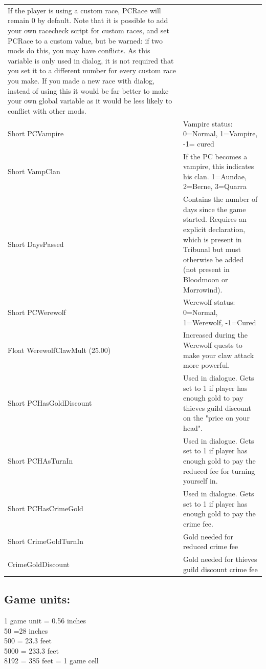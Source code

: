 \documentclass[
]{article}
\begin{document}
\begin{longtable}[]{@{}
  >{\raggedright\arraybackslash}p{}
  >{\raggedright\arraybackslash}p{}@{}}
If the player is using a custom race, PCRace will remain 0 by default.
Note that it is possible to add your own racecheck script for custom
races, and set PCRace to a custom value, but be warned: if two mods do
this, you may have conflicts. As this variable is only used in dialog,
it is not required that you set it to a different number for every
custom race you make. If you made a new race with dialog, instead of
using this it would be far better to make your own global variable as it
would be less likely to conflict with other mods. \\
Short PCVampire & Vampire status: 0=Normal, 1=Vampire, -1= cured \\
Short VampClan & If the PC becomes a vampire, this indicates his clan.
1=Aundae, 2=Berne, 3=Quarra \\
Short DaysPassed & Contains the number of days since the game started.
Requires an explicit declaration, which is present in Tribunal but must
otherwise be added (not present in Bloodmoon or Morrowind). \\
Short PCWerewolf & Werewolf status: 0=Normal, 1=Werewolf, -1=Cured \\
Float WerewolfClawMult (25.00) & Increased during the Werewolf quests to
make your claw attack more powerful. \\
Short PCHasGoldDiscount & Used in dialogue. Gets set to 1 if player has
enough gold to pay thieves guild discount on the "price on your
head". \\
Short PCHAsTurnIn & Used in dialogue. Gets set to 1 if player has enough
gold to pay the reduced fee for turning yourself in. \\
Short PCHasCrimeGold & Used in dialogue. Gets set to 1 if player has
enough gold to pay the crime fee. \\
Short CrimeGoldTurnIn & Gold needed for reduced crime fee \\
CrimeGoldDiscount & Gold needed for thieves guild discount crime fee \\
\bottomrule
\end{longtable}

\hypertarget{game-units}{%
\subsection{\texorpdfstring{\hfill\break
Game units:}{ Game units:}}\label{game-units}}

1 game unit = 0.56 inches\\
50 =28 inches\\
500 = 23.3 feet\\
5000 = 233.3 feet\\
8192 = 385 feet = 1 game cell
\end{document}
